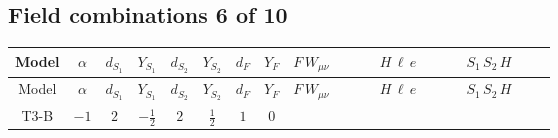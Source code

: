 \documentclass[8pt]{article}
\begin{document}
\begin{landscape}
\subsection*{Field combinations 6 of 10}
\begin{longtable}{@{}cccccccc >{\raggedright\arraybackslash}p{0.21\linewidth} >{\raggedright\arraybackslash}p{0.21\linewidth} >{\raggedright\arraybackslash}p{0.21\linewidth}@{}}
\toprule
Model & $\alpha$ & $d_{S_1}$ & $Y_{S_1}$ & $d_{S_2}$ & $Y_{S_2}$ & $d_F$ & $Y_F$ & $F\,W_{\mu\nu}$ & $H\,\ell\,e$ & $S_1\,S_2\,H$ \\
\midrule
\endfirsthead
\toprule
Model & $\alpha$ & $d_{S_1}$ & $Y_{S_1}$ & $d_{S_2}$ & $Y_{S_2}$ & $d_F$ & $Y_F$ & $F\,W_{\mu\nu}$ & $H\,\ell\,e$ & $S_1\,S_2\,H$ \\
\midrule
\endhead
T3-B & $-1$ & $2$ & $-\frac{1}{2}$ & $2$ & $\frac{1}{2}$ & $1$ & $0$ &  & \scriptsize\adjustbox{max width=\linewidth}{$\begin{gathered} +\frac{\hbar  \overline{y_{1,i_3,r_1}} \overline{L_{a_1,i_2}}\, P_R\, e_{i_1} H_{a_1} y_{1,i_2,r_1} Y_{e,i_3,i_1}}{4 \epsilon } \\ +\frac{3}{8} \hbar  \overline{y_{1,i_3,r_1}} \overline{L_{a_1,i_2}}\, P_R\, e_{i_1} H_{a_1} y_{1,i_2,r_1} Y_{e,i_3,i_1} \\ +\frac{\hbar  \overline{y_{2,i_3,r_1}} \overline{L_{a_1,i_2}}\, P_R\, e_{i_1} H_{a_1} y_{2,i_2,r_1} Y_{e,i_3,i_1}}{4 \epsilon }\end{gathered}$} & \scriptsize\adjustbox{max width=\linewidth}{$\begin{gathered} -\frac{2 \hbar  \overline{y_{2,i_1,r_1}} \overline{Y_{e,i_2,i_3}} H_{a_2} S_{1,j_1} S_{2,j_2} y_{1,i_2,r_1} Y_{e,i_1,i_3} \mathcal{I}_{y_1,a_1,j_1} {\mathcal{I}_{y_2}}^{*}_{a_2,j_2} H_{a_1}{}^{\dagger }}{\epsilon } \\ -2 \hbar  \overline{y_{2,i_1,r_1}} \overline{Y_{e,i_2,i_3}} H_{a_2} S_{1,j_1} S_{2,j_2} y_{1,i_2,r_1} Y_{e,i_1,i_3} \mathcal{I}_{y_1,a_1,j_1} {\mathcal{I}_{y_2}}^{*}_{a_2,j_2} H_{a_1}{}^{\dagger } \\ +\overline{\lambda_{T3}} S_{2,j_2} {\mathcal{I}_{T3}}^{*}_{a_1,a_2,j_1,j_2} H_{a_1}{}^{\dagger } H_{a_2}{}^{\dagger } S_{1,j_1}{}^{\dagger }\end{gathered}$} \\

\end{longtable}
\end{landscape}
\end{document}
